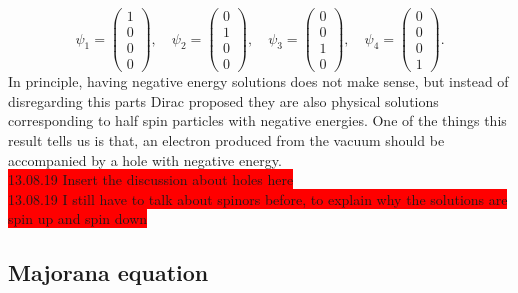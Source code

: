 \begin{equation*}
    \psi_1 = \begin{pmatrix} 1 \\0 \\0 \\0\end{pmatrix}, \quad 
    \psi_2 = \begin{pmatrix} 0 \\1 \\0 \\0\end{pmatrix}, \quad 
    \psi_3 = \begin{pmatrix} 0 \\0 \\1 \\0\end{pmatrix}, \quad 
    \psi_4 = \begin{pmatrix} 0 \\0 \\0 \\1\end{pmatrix}.
\end{equation*}
In principle, having negative energy solutions does not make sense, but instead of disregarding this parts Dirac proposed they are also physical solutions corresponding to half spin particles with negative energies. One of the things this result tells us is that, an electron produced from the vacuum should be accompanied by a hole with negative energy.\\

\colorbox{red}{13.08.19 Insert the discussion about holes here}\\

\colorbox{red}{13.08.19 I still have to talk about spinors before, to explain why the solutions are spin up and spin down}

\subsection{Majorana equation}


